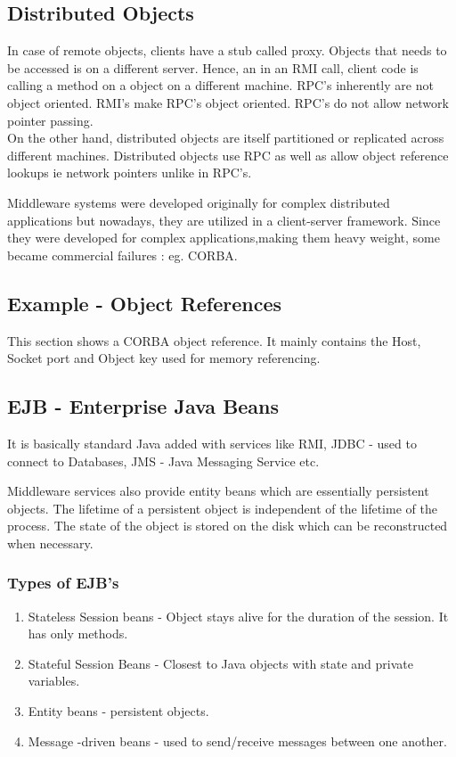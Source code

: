 \documentclass[a4paper]{article}
\begin{document}
\subsection{Distributed Objects}

In case of remote objects, clients have a stub called proxy. Objects that needs to be accessed is on a different server. Hence, an in an RMI call, client code is calling a method on a object on a different machine. RPC's inherently are not object oriented. RMI's make RPC's object oriented. RPC's do not allow network pointer passing. \\

On the other hand, distributed objects are itself partitioned or replicated across different machines. Distributed objects use RPC as well as allow object reference lookups ie network pointers unlike in RPC's.

Middleware systems were developed originally for complex distributed applications but nowadays, they are utilized in a client-server framework. Since they were developed for complex applications,making them heavy weight, some became commercial failures : eg. CORBA.

\subsection{Example - Object References}
This section shows a CORBA object reference. It mainly contains the Host, Socket port and Object key used for memory referencing.

\subsection{EJB - Enterprise Java Beans}

It is basically standard Java added with services like RMI, JDBC - used to connect to Databases, JMS - Java Messaging Service etc.

Middleware services also provide entity beans which are essentially persistent objects. The lifetime of a persistent object is independent of the lifetime of the process. The state of the object is stored on the disk which can be reconstructed when necessary.

\subsubsection{Types of EJB's}


\begin{enumerate}
  \item  Stateless Session beans - Object stays alive for the duration of the session. It has only methods.
  \item Stateful Session Beans - Closest to Java objects with state and private variables.
  \item  Entity beans - persistent objects.
  \item Message -driven beans - used to send/receive messages between  one another.
  
\end{enumerate}
\end{document}
